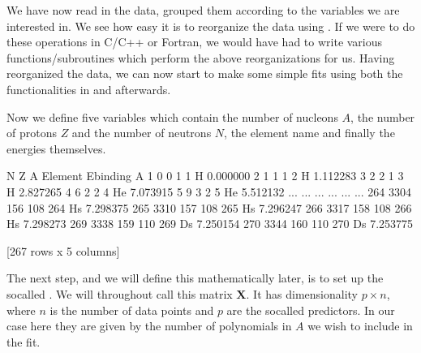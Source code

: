 \documentclass[letterpaper,10pt,english]{sphinxmanual}
\begin{document}
We have now read in the data, grouped them according to the variables we are interested in.
We see how easy it is to reorganize the data using . If we
were to do these operations in C/C++ or Fortran, we would have had to
write various functions/subroutines which perform the above
reorganizations for us.  Having reorganized the data, we can now start
to make some simple fits using both the functionalities in  and
 afterwards.

Now we define five variables which contain
the number of nucleons \(A\), the number of protons \(Z\) and the number of neutrons \(N\), the element name and finally the energies themselves.

\begin{sphinxVerbatim}[commandchars=\\\{\}]
  \PYG{p}{[}\PYG{p}{]}
  \PYG{p}{[}\PYG{p}{]}
  \PYG{p}{[}\PYG{p}{]}
  \PYG{p}{[}\PYG{p}{]}
  \PYG{p}{[}\PYG{p}{]}
\end{sphinxVerbatim}

\begin{sphinxVerbatim}[commandchars=\\\{\}]
            N    Z    A Element  Ebinding
A                                        
1   0       0    1    1       H  0.000000
2   1       1    1    2       H  1.112283
3   2       2    1    3       H  2.827265
4   6       2    2    4      He  7.073915
5   9       3    2    5      He  5.512132
...       ...  ...  ...     ...       ...
264 3304  156  108  264      Hs  7.298375
265 3310  157  108  265      Hs  7.296247
266 3317  158  108  266      Hs  7.298273
269 3338  159  110  269      Ds  7.250154
270 3344  160  110  270      Ds  7.253775

[267 rows x 5 columns]
\end{sphinxVerbatim}

The next step, and we will define this mathematically later, is to set up the so\sphinxhyphen{}called . We will throughout call this matrix \(\boldsymbol{X}\).
It has dimensionality \(p\times n\), where \(n\) is the number of data points and \(p\) are the so\sphinxhyphen{}called predictors. In our case here they are given by the number of polynomials in \(A\) we wish to include in the fit.
\end{document}
